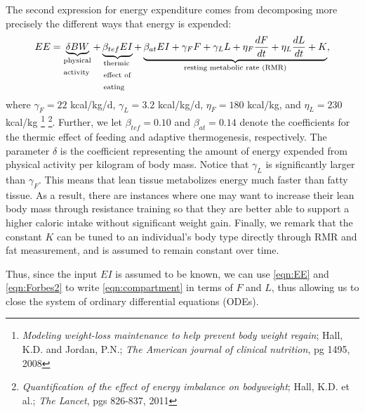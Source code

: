 The second expression for energy expenditure comes from decomposing more precisely the different ways that energy is expended:
\begin{equation}
\label{eqn:EE}
EE = \underbrace{\delta BW}_\text{\parbox{1cm}{physical\\activity}} + \underbrace{\beta_{tef} EI}_\text{\parbox{1cm}{thermic\\effect of\\eating}} + \underbrace{\beta_{at} EI + \gamma_F F + \gamma_L L + \eta_F \dfrac{dF}{dt} + \eta_L \dfrac{dL}{dt}  + K}_\text{resting metabolic rate (RMR)},
\end{equation}
where $\gamma_F = 22$ kcal/kg/d, $\gamma_L = 3.2$ kcal/kg/d, $\eta_F = 180$ kcal/kg, and $\eta_L = 230$ kcal/kg
\footnote{\emph{Modeling weight-loss maintenance to help prevent body weight regain}; Hall, K.D. and Jordan, P.N.; \emph{The American journal of clinical nutrition}, pg 1495, 2008}
\footnote{\emph{Quantification of the effect of energy imbalance on bodyweight}; Hall, K.D. et al.; \emph{The Lancet}, pgs 826-837, 2011}.
Further, we let $\beta_{tef}=0.10$ and $\beta_{at}=0.14$ denote the coefficients for the thermic effect of feeding and adaptive thermogenesis, respectively.
The parameter $\delta$ is the coefficient representing the amount of energy expended from physical activity per kilogram of body mass.
Notice that $\gamma_L$ is significantly larger than $\gamma_F$.
This means that lean tissue metabolizes energy much faster than fatty tissue.
As a result, there are instances where one may want to increase their lean body mass through resistance training so that they are better able to support a higher caloric intake without significant weight gain.
Finally, we remark that the constant $K$ can be tuned to an individual's body type directly through RMR and fat measurement, and is assumed to remain constant over time.


Thus, since the input $EI$ is assumed to be known, we can use \eqref{eqn:EE} and \eqref{eqn:Forbes2} to write \eqref{eqn:compartment} in terms of $F$ and $L$, thus allowing us to close the system of ordinary differential equations (ODEs).

